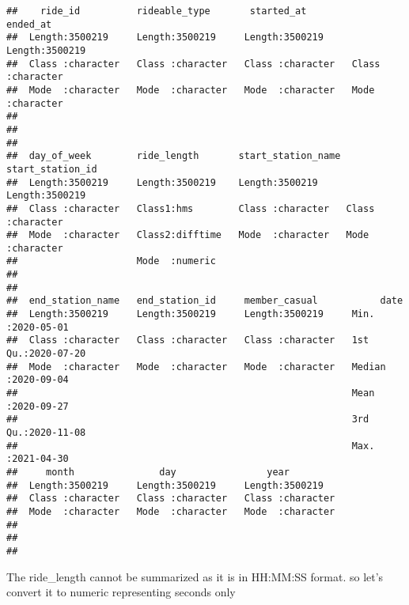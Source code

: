 \documentclass[
]{article}
\newenvironment{Shaded}{\begin{snugshade}}{\end{snugshade}}
\newcommand{\FunctionTok}[1]{\textcolor[rgb]{0.00,0.00,0.00}{#1}}
\newcommand{\NormalTok}[1]{#1}
\newcommand{\OtherTok}[1]{\textcolor[rgb]{0.56,0.35,0.01}{#1}}
\newcommand{\SpecialCharTok}[1]{\textcolor[rgb]{0.00,0.00,0.00}{#1}}
\begin{document}
\begin{verbatim}
##    ride_id          rideable_type       started_at          ended_at        
##  Length:3500219     Length:3500219     Length:3500219     Length:3500219    
##  Class :character   Class :character   Class :character   Class :character  
##  Mode  :character   Mode  :character   Mode  :character   Mode  :character  
##                                                                             
##                                                                             
##                                                                             
##  day_of_week        ride_length       start_station_name start_station_id  
##  Length:3500219     Length:3500219    Length:3500219     Length:3500219    
##  Class :character   Class1:hms        Class :character   Class :character  
##  Mode  :character   Class2:difftime   Mode  :character   Mode  :character  
##                     Mode  :numeric                                         
##                                                                            
##                                                                            
##  end_station_name   end_station_id     member_casual           date           
##  Length:3500219     Length:3500219     Length:3500219     Min.   :2020-05-01  
##  Class :character   Class :character   Class :character   1st Qu.:2020-07-20  
##  Mode  :character   Mode  :character   Mode  :character   Median :2020-09-04  
##                                                           Mean   :2020-09-27  
##                                                           3rd Qu.:2020-11-08  
##                                                           Max.   :2021-04-30  
##     month               day                year          
##  Length:3500219     Length:3500219     Length:3500219    
##  Class :character   Class :character   Class :character  
##  Mode  :character   Mode  :character   Mode  :character  
##                                                          
##                                                          
## 
\end{verbatim}

The ride\_length cannot be summarized as it is in HH:MM:SS format. so
let's convert it to numeric representing seconds only

\begin{Shaded}
\end{Shaded}
\end{document}
